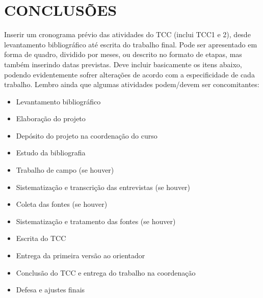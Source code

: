 \chapter{CONCLUSÕES}

Inserir um cronograma prévio das atividades do TCC (inclui TCC1 e 2), desde levantamento bibliográfico até escrita do trabalho final. Pode ser apresentado em forma de quadro, dividido por meses, ou descrito no formato de etapas, mas também inserindo datas previstas. Deve incluir basicamente os itens abaixo, podendo evidentemente sofrer alterações de acordo com a especificidade de cada trabalho. Lembro ainda que algumas atividades podem/devem ser concomitantes:

\begin{itemize}
\item Levantamento bibliográfico
\item Elaboração do projeto
\item Depósito do projeto na coordenação do curso
\item Estudo da bibliografia
\item Trabalho de campo (se houver)
\item Sistematização e transcrição das entrevistas (se houver)
\item Coleta das fontes (se houver)
\item Sistematização e tratamento das fontes (se houver)
\item Escrita do TCC
\item Entrega da primeira versão ao orientador
\item Conclusão do TCC e entrega do trabalho na coordenação
\item Defesa e ajustes finais 
\end{itemize}

